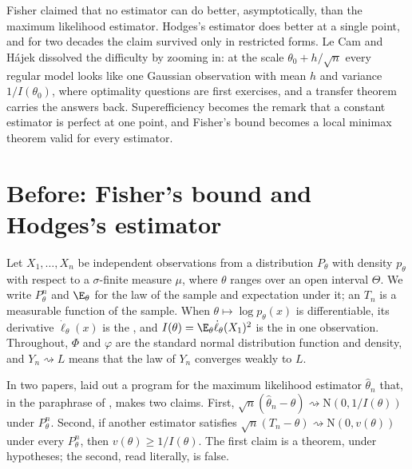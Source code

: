 \begin{refsection}

\newcommand{\lecamto}{\rightsquigarrow}
\newcommand{\lecamN}{\mathrm{N}}

\begin{chaptersummary}
Fisher claimed that no estimator can do better, asymptotically, than the maximum likelihood estimator. Hodges's estimator does better at a single point, and for two decades the claim survived only in restricted forms. Le Cam and Hájek dissolved the difficulty by zooming in: at the scale $\theta_0+h/\sqrt n$ every regular model looks like one Gaussian observation with mean $h$ and variance $1/I(\theta_0)$, where optimality questions are first exercises, and a transfer theorem carries the answers back. Superefficiency becomes the remark that a constant estimator is perfect at one point, and Fisher's bound becomes a local minimax theorem valid for every estimator.
\end{chaptersummary}

\section{Before: Fisher's bound and Hodges's estimator}\label{sec:lecam:before}

Let $X_1,\dots,X_n$ be independent observations from a distribution $P_\theta$ with density $p_\theta$ with respect to a $\sigma$-finite measure $\mu$, where $\theta$ ranges over an open interval $\Theta$. We write $P_\theta^n$ and $\E_\theta$ for the law of the sample and expectation under it; an  $T_n$ is a measurable function of the sample. When $\theta\mapsto\log p_\theta(x)$ is differentiable, its derivative $\dot\ell_\theta(x)$ is the , and $I(\theta)=\E_\theta\dot\ell_\theta(X_1)^2$ is the  in one observation. Throughout, $\Phi$ and $\varphi$ are the standard normal distribution function and density, and $Y_n\lecamto L$ means that the law of $Y_n$ converges weakly to $L$.

In two papers, \textcite{Fisher1922,Fisher1925} laid out a program for the maximum likelihood estimator $\hat\theta_n$ that, in the paraphrase of \textcite{Vovk2009}, makes two claims. First, $\sqrt n(\hat\theta_n-\theta)\lecamto\lecamN(0,1/I(\theta))$ under $P_\theta^n$. Second, if another estimator satisfies $\sqrt n(T_n-\theta)\lecamto\lecamN(0,v(\theta))$ under every $P^n_\theta$, then $v(\theta)\ge1/I(\theta)$. The first claim is a theorem, under hypotheses; the second, read literally, is false.


\end{refsection}
